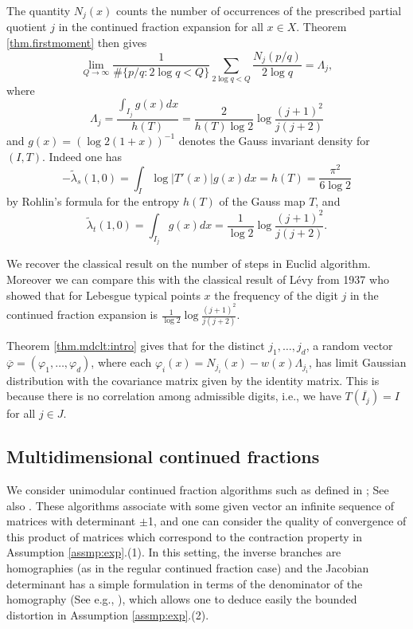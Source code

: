 \documentclass[12pt,a4paper,reqno]{amsart}
\newcommand{\tcb}{\textcolor{blue}}
\begin{document}
The quantity $N_j(x)$ counts  the number of occurrences of the prescribed partial quotient $j$ in the continued fraction expansion for
 all $x \in X$. Theorem \ref{thm.firstmoment} then gives
\[
\lim_{Q\to\infty} \frac{1}{\#\{p/q : 2\log q < Q\}} \sum_{2\log q < Q} \frac{N_j(p/q)}{2\log q}  = \Lambda_j,
\]
where $$\Lambda_j=  \frac{\int_{I_j} g(x)dx}{h(T)}= \frac{2}{h(T)\log 2} \log \frac{(j+1)^2}{j (j+2)}$$ and $g(x)=(\log 2 (1+x))^{-1}$ denotes the Gauss  invariant density for $(I,T)$. %
Indeed one has $$-\widetilde{\lambda}_s(1,0)=\int_I  \log | T'(x)|   g(x) dx=h(T)= \frac{\pi^2}{ 6 \log 2}$$ by Rohlin's formula  for  the entropy $h(T)$ of the Gauss map $T$,  and $$\widetilde{\lambda}_t(1,0)=\int_{I_j} g(x) dx=\frac{1}{\log 2} \log \frac{(j+1)^2}{j (j+2)}.$$

We recover the classical result on the number of steps in Euclid algorithm.
Moreover we can compare this with the classical result of L\'evy from 1937 who showed that for Lebesgue typical points $x$  the frequency of the digit $j$ in the continued fraction expansion is $\frac{1}{\log 2} \log \frac{(j+1)^2}{j (j+2)}$. 


Theorem \ref{thm.mdclt:intro} gives that for the distinct $j_1, \ldots, j_d$, a random vector $\overline \varphi=(\varphi_1, \ldots, \varphi_d)$, where each $\varphi_i(x) = N_{j_i}(x) - w(x)\Lambda_{j_i} $, has limit Gaussian distribution with the covariance matrix  given by the identity matrix. This is because there is no correlation among admissible digits, i.e., we have $T(\overline{I_j})=I$ for all $j \in J$.




\subsection{Multidimensional continued fractions}  \label{subsec:mcf}
 We consider unimodular continued fraction algorithms such as  defined in \cite{Lagarias:93}; See also \cite{Schweiger:00}.  These algorithms 
associate with some  given vector   an infinite sequence of matrices with determinant $\pm$1, and one can consider the quality of convergence  of this product of matrices which correspond to the contraction property in Assumption \ref{assmp:exp}.(1).
 In this setting, the inverse branches  are  homographies  (as in the regular continued fraction case) and the Jacobian determinant has a simple formulation in terms of the denominator of the 
 homography (See e.g., \cite[Proposition~5.2]{Veech:78}), which allows one  to deduce easily   the bounded distortion in Assumption  \ref{assmp:exp}.(2). 
\end{document}

